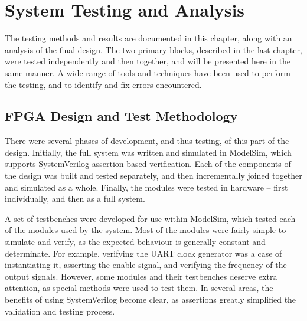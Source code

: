 \chapter{System Testing and Analysis} %
\label{cha:system_testing}


The testing methods and results are documented in this chapter, along with an analysis of the final design.  The two primary blocks, described in the last chapter, were tested independently and then together, and will be presented here in the same manner.  A wide range of tools and techniques have been used to perform the testing, and to identify and fix errors encountered.


\section{FPGA Design and Test Methodology} %
\label{sec:fpga_design_and_test_methodology}
	There were several phases of development, and thus testing, of this part of the design.  Initially, the full system was written and simulated in ModelSim, which supports SystemVerilog assertion based verification.  Each of the components of the design was built and tested separately, and then incrementally joined together and simulated as a whole.  Finally, the modules were tested in hardware -- first individually, and then as a full system.

	A set of testbenches were developed for use within ModelSim, which tested each of the modules used by the system.  Most of the modules were fairly simple to simulate and verify, as the expected behaviour is generally constant and determinate.  For example, verifying the UART clock generator was a case of instantiating it, asserting the enable signal, and verifying the frequency of the output signals.  However, some modules and their testbenches deserve extra attention, as special methods were used to test them.  In several areas, the benefits of using SystemVerilog become clear, as assertions greatly simplified the validation and testing process.



